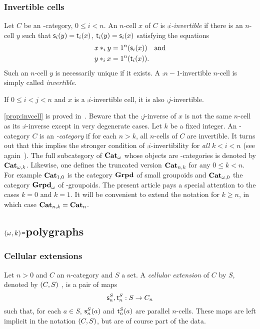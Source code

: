 \subsubsection{Invertible cells}\label{ssubsec:invert}
Let $C$ be an \oo-category, $0\leq i <n$. An $n$-cell $x$ of $C$ is {\em $\comp i$-invertible} if there is an $n$-cell $y$ such that $\mathsf{s}_{i}(y)=\mathsf{t}_{i}(x)$, $\mathsf{t}_{i}(y)=\mathsf{s}_{i}(x)$ satisfying the equations 
  \begin{align*}
    x\ast_{i} y & = 1^{n}(\mathsf{s}_{i}(x)) \quad \hbox{and}\\
    y\ast_{i} x & =  1^{n}(\mathsf{t}_{i}(x)).
  \end{align*}
  Such an $n$-cell $y$ is necessarily unique if it exists. A
  $\comp {n-1}$-invertible $n$-cell is simply called {\em invertible}. 
  \begin{proposition}\label{prop:invcell}
    If $0\leq i< j<n$ and $x$ is a $\comp i$-invertible cell, it is also $\comp j$-invertible.
  \end{proposition}
  \begin{paragr}
    \cref{prop:invcell} is proved
    in~\cite[14.5]{abgmmm:polybk}. Beware that the $\comp j$-inverse
    of $x$ is not the same $n$-cell as its $\comp i$-inverse except in
    very degenerate cases. Let $k$ be a fixed integer. An \oo-category
    $C$ is an {\em {}-category} if for each $n>k$, all $n$-cells
    of $C$ are invertible. It turns out that this implies the stronger
    condition of $\comp i$-invertibility for {\em all} $k<i<n$ (see
    again~\cite[14.5]{abgmmm:polybk}).  The full subcategory of
    $\mathbf{Cat}_{\omega}$ whose objects are -categories is denoted by $\mathbf{Cat}_{\omega,k}$. Likewise, one defines the truncated version $\mathbf{Cat}_{n,k}$ for
    any $0\leq k<n$.  For example $\mathbf{Cat}_{1,0}$ is the category $\mathbf{Grpd}$
    of small groupoids and $\mathbf{Cat}_{\omega,0}$ the category $\mathbf{Grpd}_{\omega}$ of
    \oo-groupoids. The present article pays a special attention to the
    cases $k=0$ and $k=1$. It will be convenient to extend the
    notation for $k\geq n$, in which case $\mathbf{Cat}_{n,k}=\mathbf{Cat}_{n}$.
 \end{paragr} 


 \subsection{$(\omega,k)$-polygraphs}\label{subsec:okpol}
 \subsubsection{Cellular extensions}\label{ssubsec:cellext}
 Let $n>0$ and $C$ an $n$-category and $S$ a set. A {\em cellular
   extension} of $C$ by $S$, denoted by $(C,S)$ , is a pair of maps
 \[\mathsf{s}_{n}^S,\mathsf{t}_{n}^S:S\to C_n\]
 such that, for each $a\in S$, $\mathsf{s}_{n}^S(a)$ and $\mathsf{t}_{n}^S(a)$ are
 parallel $n$-cells. These maps are left implicit in the notation
 $(C,S)$, but
 are of course part of the data. 
 
